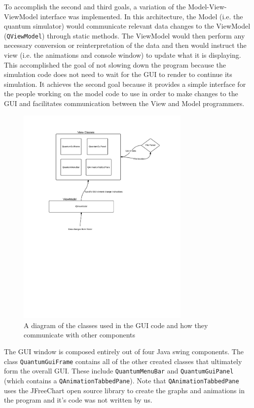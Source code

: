 \documentclass[bibliography=totocnumbered, 10pt]{article}
\theoremstyle{NoticeStyle}
\begin{document}
To accomplish the second and third goals, a variation of the Model-View-ViewModel interface was implemented.  In this architecture, the Model (i.e. the quantum simulator) would communicate relevant data changes to the ViewModel (\texttt{QViewModel}) through static methods. The ViewModel would then perform any necessary conversion or reinterpretation of the data and then would instruct the view (i.e. the animations and console window) to update what it is displaying. This accomplished the goal of not slowing down the program because the simulation code does not need to wait for the GUI to render to continue its simulation. It achieves the second goal because it provides a simple interface for the people working on the model code to use in order to make changes to the GUI and facilitates communication between the View and Model programmers.

\begin{figure}[H]
	\centering
	\includegraphics[width=0.75\textwidth]{img/GuiOverall.pdf}
	\caption{A diagram of the classes used in the GUI code and how they communicate with other components}
\end{figure}

The GUI window is composed entirely out of four Java swing components. The class \texttt{QuantumGuiFrame} contains all of the other created classes that ultimately form the overall GUI. These include \texttt{QuantumMenuBar} and \texttt{QuantumGuiPanel} (which contains a \texttt{QAnimationTabbedPane}). Note that \texttt{QAnimationTabbedPane} uses the JFreeChart open source library to create the graphs and animations in the program and it's code was not written by us.
\end{document}
